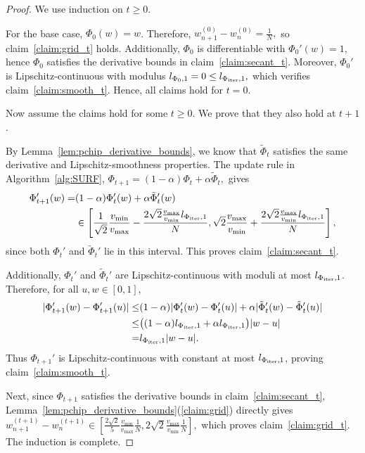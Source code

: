 \documentclass{article}
\newcommand{\Farc}{\Phi}
\begin{document}
\begin{proof}
We use induction on $t\geq 0$.

For the base case, $\Farc_0(w)=w$. Therefore,
$
w_{n+1}^{(0)}-w_n^{(0)} = \frac{1}{N},
$
so claim~\ref{claim:grid_t} holds. Additionally, $\Farc_0$ is differentiable with
$
\Farc_0'(w)=1,
$
hence $\Farc_0$ satisfies the derivative bounds in claim~\ref{claim:secant_t}. Moreover, $\Farc_0'$ is Lipschitz-continuous with modulus
$
l_{\Farc_0,1}=0\le l_{\Farc_{\rm iter},1},
$
which verifies claim~\ref{claim:smooth_t}. Hence, all claims hold for $t=0$.

Now assume the claims hold for some $t\ge 0$. We prove that they also hold at $t+1$.

By Lemma~\ref{lem:pchip_derivative_bounds}, we know that $\tilde \Farc_t$ satisfies the same derivative and Lipschitz-smoothness properties. The update rule in Algorithm~\ref{alg:SURF},
$
\Farc_{t+1}=(1-\alpha)\Farc_t+\alpha \tilde \Farc_t,
$
gives
\begin{align}
 \Farc_{t+1}'(w)
 = &
 (1-\alpha)\Farc_t'(w)+\alpha \tilde \Farc_t'(w) \nonumber \\
 &\in
 \left[\frac{1}{\sqrt2}\frac{v_{\min}}{v_{\max}}-\frac{2\sqrt2\frac{v_{\max}}{v_{\min}}l_{\Farc_{\rm iter},1}}{N},
 \sqrt2\frac{v_{\max}}{v_{\min}}+\frac{2\sqrt2\frac{v_{\max}}{v_{\min}}l_{\Farc_{\rm iter},1}}{N}\right],
\end{align}
since both $\Farc_t'$ and $\tilde \Farc_t'$ lie in this interval. This proves claim~\ref{claim:secant_t}.

Additionally, $\Farc_t'$ and $\tilde \Farc_t'$ are Lipschitz-continuous with moduli at most $l_{\Farc_{\rm iter},1}$. Therefore, for all $u,w\in[0,1]$,
\begin{align*}
|\Farc_{t+1}'(w)-\Farc_{t+1}'(u)|
\leq & (1-\alpha)|\Farc_t'(w)-\Farc_t'(u)|+\alpha |\tilde \Farc_t'(w)-\tilde \Farc_t'(u)| \\
\leq & \big((1-\alpha)l_{\Farc_{\rm iter},1}+\alpha l_{\Farc_{\rm iter},1}\big)|w-u| \\
= & l_{\Farc_{\rm iter},1}|w-u|.
\end{align*}
Thus $\Farc_{t+1}'$ is Lipschitz-continuous with constant at most $l_{\Farc_{\rm iter},1}$, proving claim~\ref{claim:smooth_t}.

Next, since $\Farc_{t+1}$ satisfies the derivative bounds in claim~\ref{claim:secant_t}, Lemma~\ref{lem:pchip_derivative_bounds}(\ref{claim:grid}) directly gives
$
w_{n+1}^{(t+1)}-w_n^{(t+1)}
\in
\left[ \frac{2\sqrt2}{5}\frac{v_{\min}}{v_{\max}}\frac{1}{N}, 2\sqrt2\frac{v_{\max}}{v_{\min}}\frac{1}{N}
\right],
$
which proves claim~\ref{claim:grid_t}. The induction is complete.
\end{proof}
\end{document}
